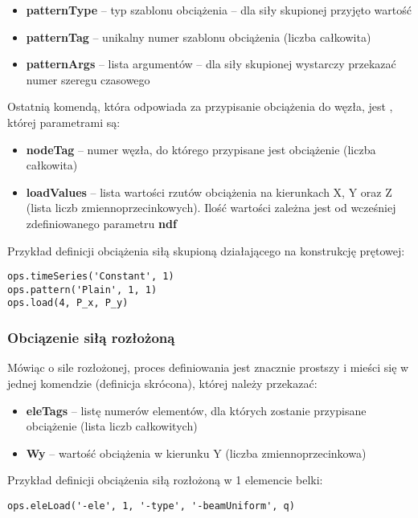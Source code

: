\begin{itemize}
    \item \textbf{patternType} – typ szablonu obciążenia – dla siły skupionej przyjęto wartość 
    \item \textbf{patternTag} – unikalny numer szablonu obciążenia (liczba całkowita)
    \item \textbf{patternArgs} – lista argumentów – dla siły skupionej wystarczy przekazać numer szeregu czasowego
\end{itemize}
Ostatnią komendą, która odpowiada za przypisanie obciążenia do węzła, jest ,
której parametrami są:

\begin{itemize}
    \item \textbf{nodeTag} – numer węzła, do którego przypisane jest obciążenie (liczba całkowita)
    \item \textbf{loadValues} – lista wartości rzutów obciążenia na kierunkach X, Y oraz Z (lista liczb zmiennoprzecinkowych). Ilość wartości zależna jest od wcześniej zdefiniowanego parametru \textbf{ndf}
\end{itemize}
Przykład definicji obciążenia siłą skupioną działającego na konstrukcję prętowej:
\begin{lstlisting}
ops.timeSeries('Constant', 1)
ops.pattern('Plain', 1, 1)
ops.load(4, P_x, P_y)
\end{lstlisting}

\subsubsection*{Obciązenie siłą rozłożoną}

Mówiąc o sile rozłożonej, proces definiowania jest znacznie prostszy i mieści się w jednej komendzie
 (definicja skrócona), której należy przekazać:

\begin{itemize}
    \item \textbf{eleTags} – listę numerów elementów, dla których zostanie przypisane obciążenie (lista liczb całkowitych)
    \item \textbf{Wy} – wartość obciążenia w kierunku Y (liczba zmiennoprzecinkowa)
\end{itemize}

Przykład definicji obciążenia siłą rozłożoną w 1 elemencie belki:
\begin{lstlisting}
ops.eleLoad('-ele', 1, '-type', '-beamUniform', q)
\end{lstlisting}

